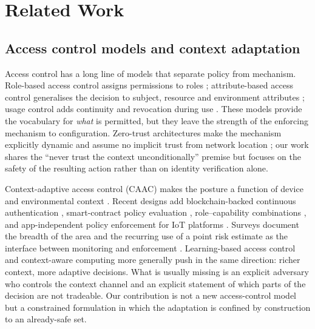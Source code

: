 \section{Related Work}
\label{sec:related}

\subsection{Access control models and context adaptation}

Access control has a long line of models that separate policy from mechanism.
Role-based access control assigns permissions to roles \cite{sandhu1996role};
attribute-based access control generalises the decision to subject, resource and
environment attributes \cite{hu2014guide}; usage control adds continuity and
revocation during use \cite{park2004ucon}. These models provide the vocabulary
for \emph{what} is permitted, but they leave the strength of the enforcing
mechanism to configuration. Zero-trust architectures make the mechanism
explicitly dynamic and assume no implicit trust from network location
\cite{rose2020zero,federici2023zero,zanasi2024flexible,stodt2025beyond}; our work
shares the ``never trust the context unconditionally'' premise but focuses on
the safety of the resulting action rather than on identity verification alone.

Context-adaptive access control (CAAC) makes the posture a function of device
and environmental context \cite{atlam2017overview,rath2017adaptive,genc2019context,arfaoui2019context}.
Recent designs add blockchain-backed continuous authentication
\cite{hussainalnaji2022cab}, smart-contract policy evaluation
\cite{merlec2024sc}, role--capability combinations \cite{krishnasrija2025dynamic},
and app-independent policy enforcement for IoT platforms \cite{mazhar2023maverick}.
Surveys document the breadth of the area and the recurring use of a point risk
estimate as the interface between monitoring and enforcement
\cite{ravidas2019access,qiu2020survey,elhajj2019survey}. Learning-based access
control \cite{nobi2022deep} and context-aware computing more generally
\cite{piccialli2021context} push in the same direction: richer context, more
adaptive decisions. What is usually missing is an explicit adversary who controls
the context channel and an explicit statement of which parts of the decision are
not tradeable. Our contribution is not a new access-control model but a
constrained formulation in which the adaptation is confined by construction to an
already-safe set.

